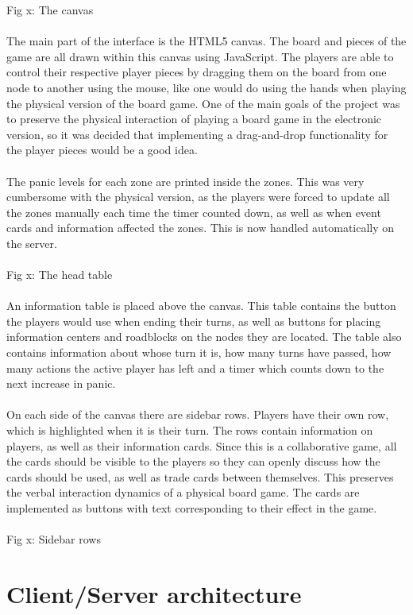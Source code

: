 Fig x: The canvas\\
\\
The main part of the interface is the HTML5 canvas. The board and pieces of the game are all drawn within this canvas using JavaScript. The players are able to control their respective player pieces by dragging them on the board from one node to another using the mouse, like one would do using the hands when playing the physical version of the board game. One of the main goals of the project was to preserve the physical interaction of playing a board game in the electronic version, so it was decided that implementing a drag-and-drop functionality for the player pieces would be a good idea. \\
\\
The panic levels for each zone are printed inside the zones. This was very cumbersome with the physical version, as the players were forced to update all the zones manually each time the timer counted down, as well as when event cards and information affected the zones. This is now handled automatically on the server. \\
\\ %
Fig x: The head table\\
\\
An information table is placed above the canvas. This table contains the button the players would use when ending their turns, as well as buttons for placing information centers and roadblocks on the nodes they are located. The table also contains information about whose turn it is, how many turns have passed, how many actions the active player has left and a timer which counts down to the next increase in panic. \\
\\
On each side of the canvas there are sidebar rows. Players have their own row, which is highlighted when it is their turn. The rows contain information on players, as well as their information cards. Since this is a collaborative game, all the cards should be visible to the players so they can openly discuss how the cards should be used, as well as trade cards between themselves. This preserves the verbal interaction dynamics of a physical board game. The cards are implemented as buttons with text corresponding to their effect in the game. \\
\\ %
Fig x: Sidebar rows



\section{Client/Server architecture}



